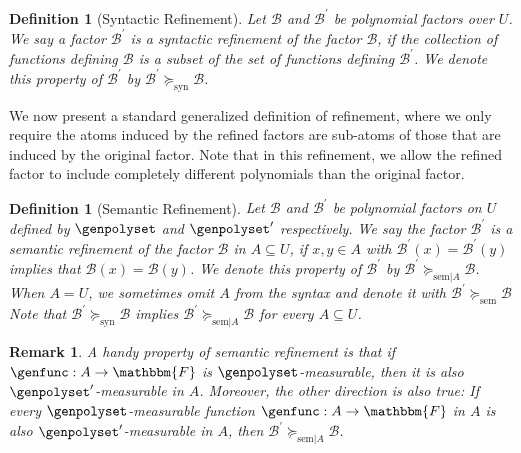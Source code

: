 \documentclass[10pt,a4paper]{article}
\newtheorem{definition}[theorem]{Definition}
\newtheorem{remark}[theorem]{Remark}
\newcommand{\basefield}[0]{\mathbbm{F}}
\newcommand{\funcdef}[3]{#1:#2\rightarrow#3}
\newcommand{\factor}[0]{\mathcal{B}}
\newcommand{\semrefine}[0]{\succeq_{\text{sem}}}
\newcommand{\semrefineex}[1]{\succeq_{\text{sem}|#1}}
\newcommand{\synrefine}[0]{\succeq_{\text{syn}}}
\begin{document}
\begin{definition}[Syntactic Refinement]
    Let $\factor$ and $\factor^\prime$ be polynomial factors over $U$.
    We say a factor $\factor^\prime$ is a \emph{syntactic refinement} of the factor $\factor$, if the collection of functions defining $\factor$ is a subset of the set
    of functions defining $\factor^\prime$.
    We denote this property of $\factor^\prime$ by $\factor^\prime \synrefine \factor$.
\end{definition}
We now present a standard generalized definition of refinement, where we only require the atoms induced by the refined factors are sub-atoms of those that are induced by the original factor.
Note that in this refinement, we allow the refined factor to include completely different polynomials than the original factor.
\begin{definition}[Semantic Refinement]\label{def:semantic-refinement}
    Let $\factor$ and $\factor^\prime$ be polynomial factors on $U$ defined by $\genpolyset$ and $\genpolyset^{\prime}$ respectively.
    We say the factor $\factor^\prime$ is a \emph{semantic refinement} of the factor $\factor$ in $A \subseteq U$,
    if $x, y \in A$ with $\factor^\prime(x) = \factor^\prime(y)$ implies that $\factor(x)=\factor(y)$.
    We denote this property of $\factor^\prime$ by $\factor^\prime \semrefineex{A} \factor$.
    When $A = U$, we sometimes omit $A$ from the syntax and denote it with $\factor^{\prime} \semrefine \factor$
    \newline
    Note that $\factor^\prime \synrefine \factor$ implies $\factor^\prime \semrefineex{A} \factor$ for every $A \subseteq U$.
\end{definition}
\begin{remark}
    A handy property of semantic refinement is that if $\funcdef{\genfunc}{A}{\basefield}$ is $\genpolyset$-measurable,
    then it is also $\genpolyset^{\prime}$-measurable in $A$.
    Moreover, the other direction is also true:
    If every $\genpolyset$-measurable function $\funcdef{\genfunc}{A}{\basefield}$ in $A$ is also $\genpolyset^{\prime}$-measurable in $A$, then $\factor^{\prime} \semrefineex{A} \factor$.
\end{remark}
\end{document}
